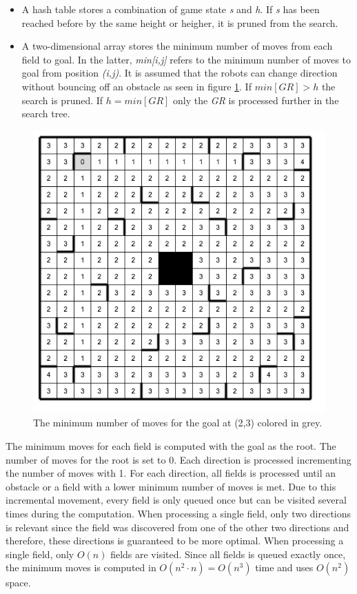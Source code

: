 \documentclass[]{article}
\providecommand{\tightlist}{%
  \setlength{\itemsep}{0pt}\setlength{\parskip}{0pt}}
\begin{document}
\begin{itemize}
\tightlist
\item
  A hash table stores a combination of game state \emph{s} and \emph{h}.
  If \emph{s} has been reached before by the same height or heigher, it
  is pruned from the search.
\item
  A two-dimensional array stores the minimum number of moves from each
  field to goal. In the latter, \emph{min{[}i,j{]}} refers to the
  minimum number of moves to goal from position \emph{(i,j)}. It is
  assumed that the robots can change direction without bouncing off an
  obstacle as seen in figure \ref{fig:minmoves}. If \(min[GR] > h\) the
  search is pruned. If \(h = min[GR]\) only the \emph{GR} is processed
  further in the search tree.
\end{itemize}

\begin{figure}[htb]
\centering
\includegraphics[width=0.6\linewidth]{img/min_moves.png}
\caption{The minimum number of moves for the goal at (2,3) colored in grey.}
\label{fig:minmoves}
\end{figure}

The minimum moves for each field is computed with the goal as the root.
The number of moves for the root is set to 0. Each direction is
processed incrementing the number of moves with 1. For each direction,
all fields is processed until an obstacle or a field with a lower
minimum number of moves is met. Due to this incremental movement, every
field is only queued once but can be visited several times during the
computation. When processing a single field, only two directions is
relevant since the field was discovered from one of the other two
directions and therefore, these directions is guaranteed to be more
optimal. When processing a single field, only \(O(n)\) fields are
visited. Since all fields is queued exactly once, the minimum moves is
computed in \(O(n^2 \cdot n) = O(n^3)\) time and uses \(O(n^2)\) space.
\end{document}
